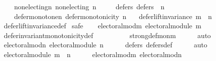 \begin{isabellebody}
\ \ \ \ non{\isacharunderscore}{\kern0pt}electing{\isacharunderscore}{\kern0pt}n{\isacharcolon}{\kern0pt}\ {\isachardoublequoteopen}non{\isacharunderscore}{\kern0pt}electing\ n{\isachardoublequoteclose}\ \isanewline
\ \ \ \ defers{\isacharunderscore}{\kern0pt}{}{\isacharcolon}{\kern0pt}\ {\isachardoublequoteopen}defers\ {}\ n{\isachardoublequoteclose}\ \isanewline
\ \ \ \ defer{\isacharunderscore}{\kern0pt}monotone{\isacharunderscore}{\kern0pt}n{\isacharcolon}{\kern0pt}\ {\isachardoublequoteopen}defer{\isacharunderscore}{\kern0pt}monotonicity\ n{\isachardoublequoteclose}\isanewline
\ \ \ {\isachardoublequoteopen}defer{\isacharunderscore}{\kern0pt}lift{\isacharunderscore}{\kern0pt}invariance\ {\isacharparenleft}{\kern0pt}m\ {\isasymtriangleright}\ n{\isacharparenright}{\kern0pt}{\isachardoublequoteclose}\isanewline
%
\isadelimproof
\ \ %
\endisadelimproof
%
\isatagproof
{}\isamarkupfalse%
\ defer{\isacharunderscore}{\kern0pt}lift{\isacharunderscore}{\kern0pt}invariance{\isacharunderscore}{\kern0pt}def\isanewline
{}\isamarkupfalse%
\ {\isacharparenleft}{\kern0pt}safe{\isacharparenright}{\kern0pt}\isanewline
\ \ \isamarkupfalse%
\ electoral{\isacharunderscore}{\kern0pt}mod{\isacharunderscore}{\kern0pt}m{\isacharcolon}{\kern0pt}\ {\isachardoublequoteopen}electoral{\isacharunderscore}{\kern0pt}module\ m{\isachardoublequoteclose}\isanewline
\ \ \ \ \isamarkupfalse%
\ defer{\isacharunderscore}{\kern0pt}invariant{\isacharunderscore}{\kern0pt}monotonicity{\isacharunderscore}{\kern0pt}def\isanewline
\ \ \ \ \ \ \ \ \ \ strong{\isacharunderscore}{\kern0pt}def{\isacharunderscore}{\kern0pt}mon{\isacharunderscore}{\kern0pt}m\isanewline
\ \ \ \ \isamarkupfalse%
\ auto\isanewline
\ \ \isamarkupfalse%
\ electoral{\isacharunderscore}{\kern0pt}mod{\isacharunderscore}{\kern0pt}n{\isacharcolon}{\kern0pt}\ {\isachardoublequoteopen}electoral{\isacharunderscore}{\kern0pt}module\ n{\isachardoublequoteclose}\isanewline
\ \ \ \ \isamarkupfalse%
\ defers{\isacharunderscore}{\kern0pt}{}\ defers{\isacharunderscore}{\kern0pt}def\isanewline
\ \ \ \ \isamarkupfalse%
\ auto\isanewline
\ \ \isamarkupfalse%
\ {\isachardoublequoteopen}electoral{\isacharunderscore}{\kern0pt}module\ {\isacharparenleft}{\kern0pt}m\ {\isasymtriangleright}\ n{\isacharparenright}{\kern0pt}{\isachardoublequoteclose}\isanewline
\ \ \ \ \isamarkupfalse%
\ electoral{\isacharunderscore}{\kern0pt}mod{\isacharunderscore}{\kern0pt}m\ electoral{\isacharunderscore}{\kern0pt}mod{\isacharunderscore}{\kern0pt}n\isanewline

\end{isabellebody}
